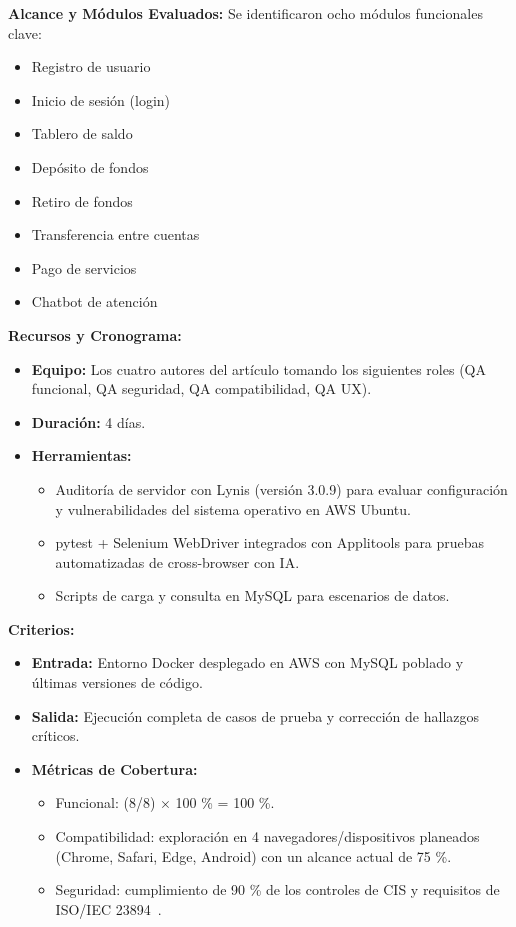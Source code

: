 \documentclass[12pt]{article}
\begin{document}
\textbf{Alcance y Módulos Evaluados:}
Se identificaron ocho módulos funcionales clave:
\begin{itemize}
    \item Registro de usuario
    \item Inicio de sesión (login)
    \item Tablero de saldo
    \item Depósito de fondos
    \item Retiro de fondos
    \item Transferencia entre cuentas
    \item Pago de servicios
    \item Chatbot de atención
\end{itemize}

\textbf{Recursos y Cronograma:}
\begin{itemize}
    \item \textbf{Equipo:} Los cuatro autores del artículo tomando los siguientes roles (QA funcional, QA seguridad, QA compatibilidad, QA UX).
    \item \textbf{Duración:} 4 días.
    \item \textbf{Herramientas:}
    \begin{itemize}
        \item Auditoría de servidor con Lynis (versión 3.0.9) para evaluar configuración y vulnerabilidades del sistema operativo en AWS Ubuntu.
        \item pytest + Selenium WebDriver integrados con Applitools para pruebas automatizadas de cross-browser con IA.
        \item Scripts de carga y consulta en MySQL para escenarios de datos.
    \end{itemize}
\end{itemize}

\textbf{Criterios:}
\begin{itemize}
    \item \textbf{Entrada:} Entorno Docker desplegado en AWS con MySQL poblado y últimas versiones de código.
    \item \textbf{Salida:} Ejecución completa de casos de prueba y corrección de hallazgos críticos.
    \item \textbf{Métricas de Cobertura:}
    \begin{itemize}
        \item Funcional: (8/8) $\times$ 100 \% = 100 \%.
        \item Compatibilidad: exploración en 4 navegadores/dispositivos planeados (Chrome, Safari, Edge, Android) con un alcance actual de 75 \%.
        \item Seguridad: cumplimiento de 90 \% de los controles de CIS y requisitos de ISO/IEC 23894~\cite{iso23894}.
    \end{itemize}
\end{itemize}
\end{document}
